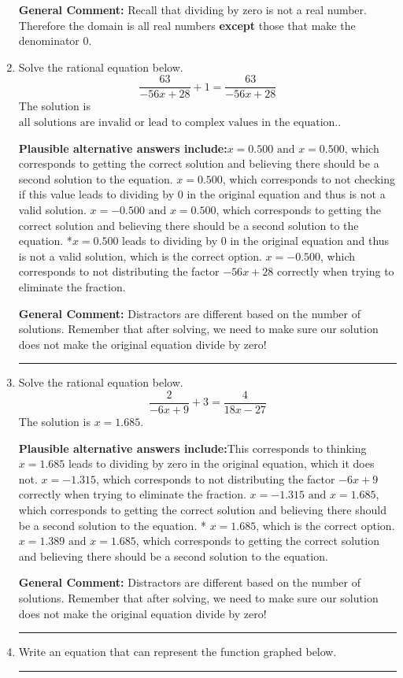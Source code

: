 \documentclass{extbook}[14pt]
\newcommand{\litem}[1]{\item #1

\rule{\textwidth}{0.4pt}}
\begin{document}
\begin{enumerate}
{\textbf{General Comment:} Recall that dividing by zero is not a real number. Therefore the domain is all real numbers \textbf{except} those that make the denominator 0.
}
\litem{
Solve the rational equation below.
\[ \frac{63}{-56x + 28} + 1 = \frac{63}{-56x + 28} \]The solution is \( \text{all solutions are invalid or lead to complex values in the equation.} \).\begin{enumerate}[label=\Alph*.]
\textbf{Plausible alternative answers include:}$x = 0.500 \text{ and } x = 0.500$, which corresponds to getting the correct solution and believing there should be a second solution to the equation.
$x = 0.500$, which corresponds to not checking if this value leads to dividing by 0 in the original equation and thus is not a valid solution.
$x = -0.500 \text{ and } x = 0.500$, which corresponds to getting the correct solution and believing there should be a second solution to the equation.
*$x = 0.500$ leads to dividing by 0 in the original equation and thus is not a valid solution, which is the correct option.
$x = -0.500$, which corresponds to not distributing the factor $-56x + 28$ correctly when trying to eliminate the fraction.
\end{enumerate}

\textbf{General Comment:} Distractors are different based on the number of solutions. Remember that after solving, we need to make sure our solution does not make the original equation divide by zero!
}
\litem{
Solve the rational equation below.
\[ \frac{2}{-6x + 9} + 3 = \frac{4}{18x -27} \]The solution is \( x = 1.685 \).\begin{enumerate}[label=\Alph*.]
\textbf{Plausible alternative answers include:}This corresponds to thinking $x = 1.685$ leads to dividing by zero in the original equation, which it does not.
$x = -1.315$, which corresponds to not distributing the factor $-6x + 9$ correctly when trying to eliminate the fraction.
$x = -1.315 \text{ and } x = 1.685$, which corresponds to getting the correct solution and believing there should be a second solution to the equation.
* $x = 1.685$, which is the correct option.
$x = 1.389 \text{ and } x = 1.685$, which corresponds to getting the correct solution and believing there should be a second solution to the equation.
\end{enumerate}

\textbf{General Comment:} Distractors are different based on the number of solutions. Remember that after solving, we need to make sure our solution does not make the original equation divide by zero!
}
\litem{
Write an equation that can represent the function graphed below.

}
\end{enumerate}
\end{document}
